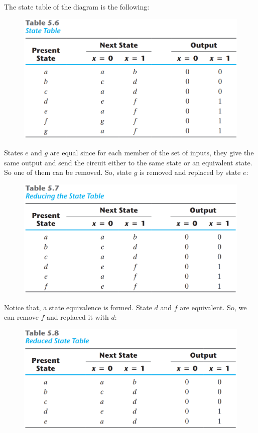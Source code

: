 \vspace*{\fill}
\columnbreak

\noindent The state table of the diagram is the following:
\begin{figure}[H]
  \centering
  \includegraphics[width=\linewidth]{img/table-5.6.png}
  \label{table:5.6}
\end{figure}

States $e$ and $g$ are equal since for each member of the set of inputs, they give the same output and send the circuit either to the same state or an equivalent state. So one of them can be removed. So, state $g$ is removed and replaced by state $e$:
\begin{figure}[H]
  \centering
  \includegraphics[width=\linewidth]{img/table-5.7.png}
  \label{table:5.7}
\end{figure}
\noindent Notice that, a state equivalence is formed. State $d$ and $f$ are equivalent. So, we can remove $f$ and replaced it with $d$:
\begin{figure}[H]
  \centering
  \includegraphics[width=\linewidth]{img/table-5.8.png}
  \label{table:5.8}
\end{figure}
